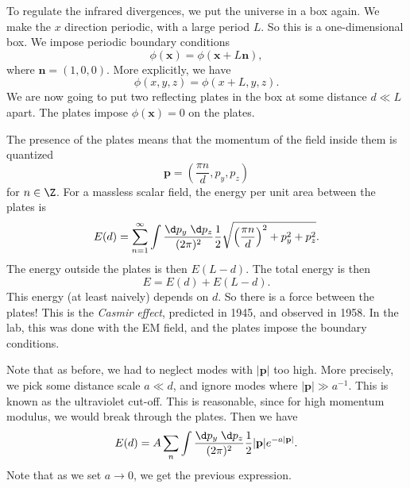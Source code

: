 \documentclass[a4paper]{article}
\begin{document}
To regulate the infrared divergences, we put the universe in a box again. We make the $x$ direction periodic, with a large period $L$. So this is a one-dimensional box. We impose periodic boundary conditions
\[
  \phi(\mathbf{x}) = \phi(\mathbf{x} + L \mathbf{n}),
\]
where $\mathbf{n} = (1, 0, 0)$. More explicitly, we have
\[
  \phi(x, y, z) = \phi(x + L, y, z).
\]
We are now going to put two reflecting plates in the box at some distance $d \ll L$ apart. The plates impose $\phi(\mathbf{x}) = 0$ on the plates.
\begin{center}
\end{center}
The presence of the plates means that the momentum of the field inside them is quantized
\[
  \mathbf{p} = \left(\frac{\pi n}{d}, p_y, p_z\right)
\]
for $n \in \Z$. For a massless scalar field, the energy per unit area between the plates is
\[
  E(d) = \sum_{n = 1}^\infty \int \frac{\d p_y\;\d p_z}{(2\pi)^2} \frac{1}{2} \sqrt{\left(\frac{\pi n}{d}\right)^2 + p_y^2 +p_z^2}.
\]
The energy outside the plates is then $E(L - d)$. The total energy is then
\[
  E = E(d) + E(L - d).
\]
This energy (at least naively) depends on $d$. So there is a force between the plates! This is the \emph{Casmir effect}, predicted in 1945, and observed in 1958. In the lab, this was done with the EM field, and the plates impose the boundary conditions.

Note that as before, we had to neglect modes with $|\mathbf{p}|$ too high. More precisely, we pick some distance scale $a \ll d$, and ignore modes where $|\mathbf{p}| \gg a^{-1}$. This is known as the ultraviolet cut-off. This is reasonable, since for high momentum modulus, we would break through the plates. Then we have
\[
  E(d) = A \sum_n \int \frac{\d p_y \;\d p_z}{(2\pi)^2} \frac{1}{2}|\mathbf{p}| e^{-a|\mathbf{p}|}.
\]
Note that as we set $a \to 0$, we get the previous expression.
\end{document}
